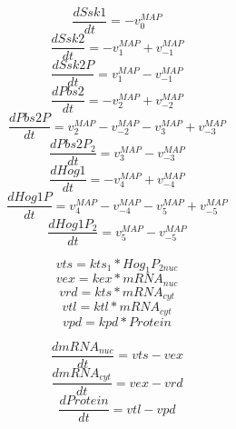 \documentclass[11pt]{amsart}
\begin{document}
\[\frac{dSsk1}{dt} = -v_0^{MAP}\]
\[\frac{dSsk2}{dt} = -v_1^{MAP} + v_{-1}^{MAP} \]
\[\frac{dSsk2P}{dt} = v_1^{MAP} - v_{-1}^{MAP} \]
\[\frac{dPbs2}{dt} = -v_2^{MAP} + v_{-2}^{MAP}\]
\[\frac{dPbs2P}{dt} = v_2^{MAP} - v_{-2}^{MAP} - v_3^{MAP} + v_{-3}^{MAP}\]
\[\frac{dPbs2P_2}{dt} = v_3^{MAP} - v_{-3}^{MAP} \]
\[\frac{dHog1}{dt} = -v_4^{MAP} + v_{-4}^{MAP}\]
\[\frac{dHog1P}{dt} = v_4^{MAP} - v_{-4}^{MAP} - v_{5}^{MAP} + v_{-5}^{MAP} \]
\[\frac{dHog1P_2}{dt} =  v_{5}^{MAP} - v_{-5}^{MAP}\]

\clearpage

\[vts = kts_1*Hog_1P_{2nuc}\]
\[vex = kex*mRNA_{nuc}\]
\[vrd = kts*mRNA_{cyt}\]
\[vtl = ktl*mRNA_{cyt}\]
\[vpd = kpd*Protein\]


\[\frac{dmRNA_{nuc}}{dt} = vts - vex\]
\[\frac{dmRNA_{cyt}}{dt} = vex - vrd\]
\[\frac{dProtein}{dt} = vtl - vpd\]
\end{document}
